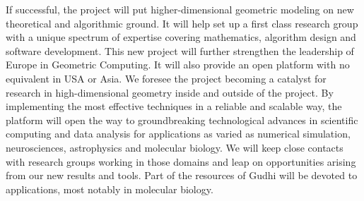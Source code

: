 
If successful, the project will put higher-dimensional geometric modeling on new theoretical and algorithmic ground. It will help set up a first class research group with a unique spectrum of expertise covering mathematics, algorithm design and software development.
This new project will further strengthen the leadership of Europe  in Geometric Computing.
It will also provide an open platform with no equivalent in USA or Asia.
We foresee the project becoming a catalyst for research in high-dimensional geometry inside and outside of the project.  
By implementing the most effective techniques in a  reliable and scalable way, the platform will
open the way to groundbreaking technological advances in scientific computing and data analysis for applications as varied as numerical simulation, neurosciences, astrophysics and molecular biology. We will keep close contacts with research groups working in those domains and leap on opportunities arising from our new results and tools. Part of the resources of Gudhi will be devoted to applications, most notably in molecular biology.

% 
% 


